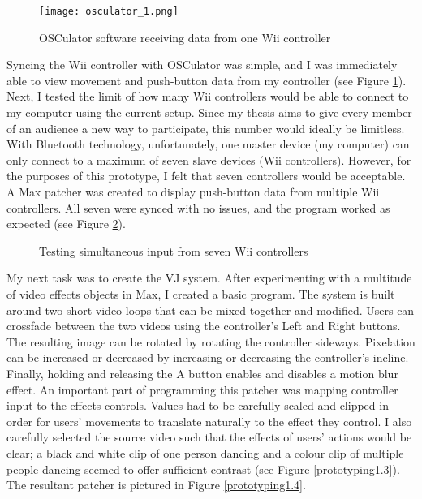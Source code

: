 \begin{figure}[t]
	\centering

	\texttt{[image: osculator\_1.png]}
	\caption{OSCulator software receiving data from one Wii controller}

	\label{prototyping1.1}
\end{figure}

Syncing the Wii controller with OSCulator was simple, and I was immediately able to view movement and push-button data from my controller (see Figure \ref{prototyping1.1}). Next, I tested the limit of how many Wii controllers would be able to connect to my computer using the current setup. Since my thesis aims to give every member of an audience a new way to participate, this number would ideally be limitless. With Bluetooth technology, unfortunately, one master device (my computer) can only connect to a maximum of seven slave devices (Wii controllers). However, for the purposes of this prototype, I felt that seven controllers would be acceptable. A Max patcher was created to display push-button data from multiple Wii controllers. All seven were synced with no issues, and the program worked as expected (see Figure \ref{prototyping1.2}).

\begin{figure}[t]
	\centering

	\hspace{0.1cm}
	\caption{Testing simultaneous input from seven Wii controllers}

	\label{prototyping1.2}
\end{figure}

My next task was to create the VJ system. After experimenting with a multitude of video effects objects in Max, I created a basic program. The system is built around two short video loops that can be mixed together and modified. Users can crossfade between the two videos using the controller's Left and Right buttons. The resulting image can be rotated by rotating the controller sideways. Pixelation can be increased or decreased by increasing or decreasing the controller's incline. Finally, holding and releasing the A button enables and disables a motion blur effect. An important part of programming this patcher was mapping controller input to the effects controls. Values had to be carefully scaled and clipped in order for users' movements to translate naturally to the effect they control. I also carefully selected the source video such that the effects of users' actions would be clear; a black and white clip of one person dancing and a colour clip of multiple people dancing seemed to offer sufficient contrast (see Figure \ref{prototyping1.3}). The resultant patcher is pictured in Figure \ref{prototyping1.4}.

